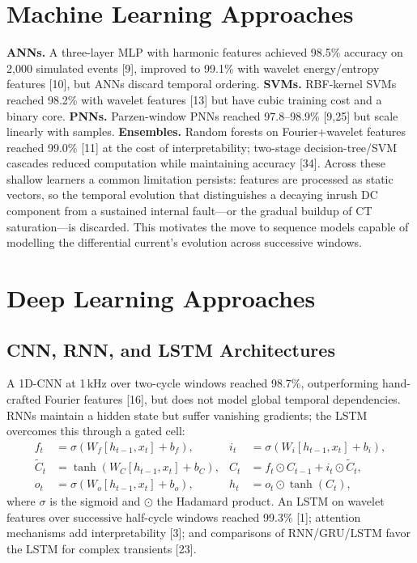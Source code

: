 \documentclass[12pt,a4paper,oneside]{report}
\begin{document}
\section{Machine Learning Approaches}
\textbf{ANNs.} A three-layer MLP with harmonic features achieved 98.5\% accuracy on 2{,}000 simulated events [9], improved to 99.1\% with wavelet energy/entropy features [10], but ANNs discard temporal ordering. \textbf{SVMs.} RBF-kernel SVMs reached 98.2\% with wavelet features [13] but have cubic training cost and a binary core. \textbf{PNNs.} Parzen-window PNNs reached 97.8--98.9\% [9,25] but scale linearly with samples. \textbf{Ensembles.} Random forests on Fourier+wavelet features reached 99.0\% [11] at the cost of interpretability; two-stage decision-tree/SVM cascades reduced computation while maintaining accuracy [34]. Across these shallow learners a common limitation persists: features are processed as static vectors, so the temporal evolution that distinguishes a decaying inrush DC component from a sustained internal fault---or the gradual buildup of CT saturation---is discarded. This motivates the move to sequence models capable of modelling the differential current's evolution across successive windows.

\section{Deep Learning Approaches}
\subsection{CNN, RNN, and LSTM Architectures}
A 1D-CNN at 1\,kHz over two-cycle windows reached 98.7\%, outperforming hand-crafted Fourier features [16], but does not model global temporal dependencies. RNNs maintain a hidden state but suffer vanishing gradients; the LSTM overcomes this through a gated cell:
\begin{align}
f_t&=\sigma(W_f[h_{t-1},x_t]+b_f), & i_t&=\sigma(W_i[h_{t-1},x_t]+b_i),\\
\tilde{C}_t&=\tanh(W_C[h_{t-1},x_t]+b_C), & C_t&=f_t\odot C_{t-1}+i_t\odot \tilde{C}_t,\\
o_t&=\sigma(W_o[h_{t-1},x_t]+b_o), & h_t&=o_t\odot\tanh(C_t),
\end{align}
where $\sigma$ is the sigmoid and $\odot$ the Hadamard product. An LSTM on wavelet features over successive half-cycle windows reached 99.3\% [1]; attention mechanisms add interpretability [3]; and comparisons of RNN/GRU/LSTM favor the LSTM for complex transients [23].
\end{document}
